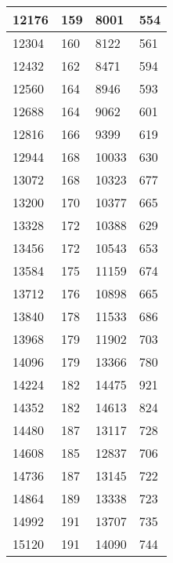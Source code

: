 \begin{longtable}{|l|l|l|l|}
		12176 & 159         & 8001            & 554              \\ \hline
		12304 & 160         & 8122            & 561              \\ \hline
		12432 & 162         & 8471            & 594              \\ \hline
		12560 & 164         & 8946            & 593              \\ \hline
		12688 & 164         & 9062            & 601              \\ \hline
		12816 & 166         & 9399            & 619              \\ \hline
		12944 & 168         & 10033           & 630              \\ \hline
		13072 & 168         & 10323           & 677              \\ \hline
		13200 & 170         & 10377           & 665              \\ \hline
		13328 & 172         & 10388           & 629              \\ \hline
		13456 & 172         & 10543           & 653              \\ \hline
		13584 & 175         & 11159           & 674              \\ \hline
		13712 & 176         & 10898           & 665              \\ \hline
		13840 & 178         & 11533           & 686              \\ \hline
		13968 & 179         & 11902           & 703              \\ \hline
		14096 & 179         & 13366           & 780              \\ \hline
		14224 & 182         & 14475           & 921              \\ \hline
		14352 & 182         & 14613           & 824              \\ \hline
		14480 & 187         & 13117           & 728              \\ \hline
		14608 & 185         & 12837           & 706              \\ \hline
		14736 & 187         & 13145           & 722              \\ \hline
		14864 & 189         & 13338           & 723              \\ \hline
		14992 & 191         & 13707           & 735              \\ \hline
		15120 & 191         & 14090           & 744              \\ \hline

\end{longtable}
